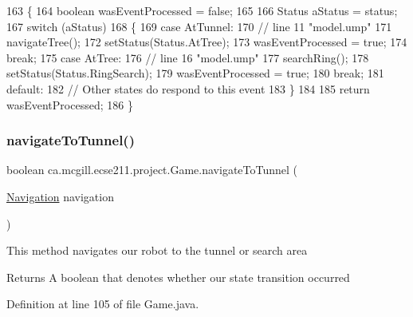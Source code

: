 \begin{DoxyCode}
163   \{
164     \textcolor{keywordtype}{boolean} wasEventProcessed = \textcolor{keyword}{false};
165     
166     Status aStatus = status;
167     \textcolor{keywordflow}{switch} (aStatus)
168     \{
169       \textcolor{keywordflow}{case} AtTunnel:
170         \textcolor{comment}{// line 11 "model.ump"}
171         navigateTree();
172         setStatus(Status.AtTree);
173         wasEventProcessed = \textcolor{keyword}{true};
174         \textcolor{keywordflow}{break};
175       \textcolor{keywordflow}{case} AtTree:
176         \textcolor{comment}{// line 16 "model.ump"}
177         searchRing();
178         setStatus(Status.RingSearch);
179         wasEventProcessed = \textcolor{keyword}{true};
180         \textcolor{keywordflow}{break};
181       \textcolor{keywordflow}{default}:
182         \textcolor{comment}{// Other states do respond to this event}
183     \}
184 
185     \textcolor{keywordflow}{return} wasEventProcessed;
186   \}
\end{DoxyCode}
\mbox{\label{enumca_1_1mcgill_1_1ecse211_1_1project_1_1_game_af5cb4d96a0075ef2d4ab5e0be90b8875}} 
\subsubsection{\texorpdfstring{navigate\+To\+Tunnel()}{navigateToTunnel()}}
{\footnotesize\ttfamily boolean ca.\+mcgill.\+ecse211.\+project.\+Game.\+navigate\+To\+Tunnel (\begin{DoxyParamCaption}\item[{\hyperlink{classca_1_1mcgill_1_1ecse211_1_1project_1_1_navigation}{Navigation}}]{navigation }\end{DoxyParamCaption})}

This method navigates our robot to the tunnel or search area

\begin{DoxyReturn}{Returns}
A boolean that denotes whether our state transition occurred 
\end{DoxyReturn}


Definition at line 105 of file Game.\+java.


